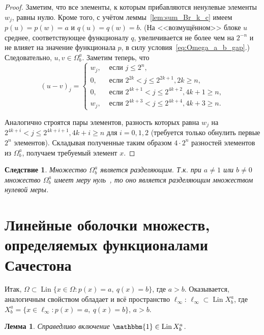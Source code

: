 \documentclass[a4paper,14pt]{article} %
\theoremstyle{plain}
\newtheorem{lemma}{Лемма}[section]
\newtheorem{corollary}{Следствие}[lemma]
\begin{document}
\begin{proof}
	Заметим, что все элементы, к которым прибавляются ненулевые элементы $w_j$, равны нулю.
	Кроме того, с учётом леммы~\ref{lem:sum_Br_k_c} имеем $p(u)=p(w)=a$ и $q(u)=q(w)=b$.
	(На <<возмущённом>> блоке $u$ среднее, соответствующее функционалу $q$,
	увеличивается не более чем на $2^{-n}$ и не влияет на значение функционала $p$,
	в силу условия~\eqref{eq:Omega_a_b_gap}.)
	Следовательно, $u,v\in\Omega^a_b$.
	Заметим теперь, что
	\begin{equation}
		(u-v)_j = \begin{cases}
			w_j,  & \mbox{~если~} j \leq 2^n,
			\\
			0,  & \mbox{~если~} 2^{2k  } < j \leq 2^{2k+1}, 2k    \geq n,
			\\
			0,  & \mbox{~если~} 2^{4k+1} < j \leq 2^{4k+2}, 4k + 1 \geq n,
			\\
			w_j,  & \mbox{~если~} 2^{4k+3} < j \leq 2^{4k+4}, 4k + 3 \geq n
			.
		\end{cases}
	\end{equation}

	Аналогично строятся пары элементов, разность которых равна $w_j$ на $2^{4k+i} < j \leq 2^{4k+i+1}, 4k + i \geq n$ для $i=0,1,2$
	(требуется только обнулить первые $2^n$ элементов).
	Складывая полученные таким образом $4\cdot 2^n$ разностей элементов из $\Omega^a_b$, получаем требуемый элемент $x$.

\end{proof}

\begin{corollary}
	Множество $\Omega^a_b$ является разделяющим.
	Т.к. при $a\neq 1$ или $b\neq 0$ множество $\Omega^a_b$ имеет меру нуль~\cite{semenov2010characteristic},
	то оно является разделяющим множеством нулевой меры.
\end{corollary}



\section{Линейные оболочки множеств, определяемых функционалами Сачестона}

Итак, $\Omega \subset \operatorname{Lin}\{x\in\Omega : p(x) = a,~ q(x) = b\}$, где $a>b$.
Оказывается, аналогичным свойством обладает и всё пространство $\ell_\infty$:
$\ell_\infty\subset \operatorname{Lin} X^a_b$, где
$X^a_b = \{x\in\ell_\infty : p(x) = a,~ q(x) = b\}$, $a>b$.

\begin{lemma}
	\label{lem:const_Lin_ell_infty}
	Справедливо включение
	$\mathbbm{1}\in \operatorname{Lin} X^a_b$.
\end{lemma}
\end{document}
